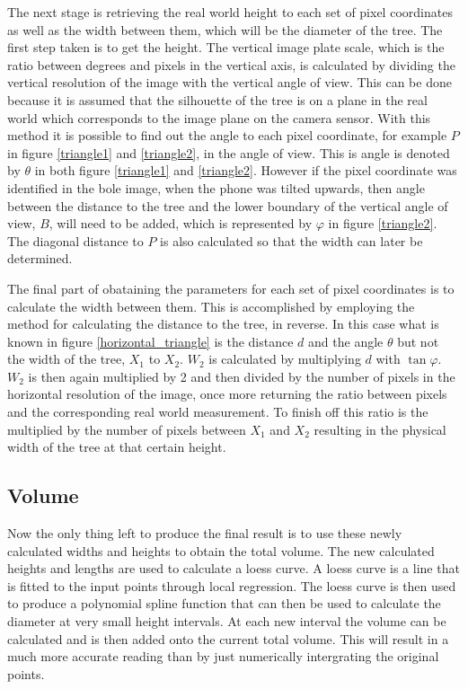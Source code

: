 The next stage is retrieving the real world height to each set of pixel coordinates as well as the width between them, which will be the diameter of the tree. The first step taken is to get the height. The vertical image plate scale, which is the ratio between degrees and pixels in the vertical axis, is calculated by dividing the vertical resolution of the image with the vertical angle of view. This can be done because it is assumed that the silhouette of the tree is on a plane in the real world which corresponds to the image plane on the camera sensor. With this method it is possible to find out the angle to each pixel coordinate, for example $P$ in figure \ref{triangle1} and \ref{triangle2}, in the angle of view. This is angle is denoted by $\theta$ in both figure \ref{triangle1} and \ref{triangle2}. However if the pixel coordinate was identified in the bole image, when the phone was tilted upwards, then angle between the distance to the tree and the lower boundary of the vertical angle of view, $B$, will need to be added, which is represented by $\varphi$ in figure \ref{triangle2}. The diagonal distance to $P$ is also calculated so that the width can later be determined.

The final part of obataining the parameters for each set of pixel coordinates is to calculate the width between them. This is accomplished by employing the method for calculating the distance to the tree, in reverse. In this case what is known in figure \ref{horizontal_triangle} is the distance $d$ and the angle $\theta$ but not the width of the tree, $X_1$ to $X_2$. $W_2$ is calculated by multiplying $d$ with $\tan{\varphi}$. $W_2$ is then again multiplied by 2 and then divided by the number of pixels in the horizontal resolution of the image, once more returning the ratio between pixels and the corresponding real world measurement. To finish off this ratio is the multiplied by the number of pixels between $X_1$ and $X_2$ resulting in the physical width of the tree at that certain height.


\subsection{Volume}
Now the only thing left to produce the final result is to use these newly calculated widths and heights to obtain the total volume. The new calculated heights and lengths are used to calculate a loess curve. A loess curve is a line that is fitted to the input points through local regression. The loess curve is then used to produce a polynomial spline function that can then be used to calculate the diameter at very small height intervals. At each new interval the volume can be calculated and is then added onto the current total volume. This will result in a much more accurate reading than by just numerically intergrating the original points.


